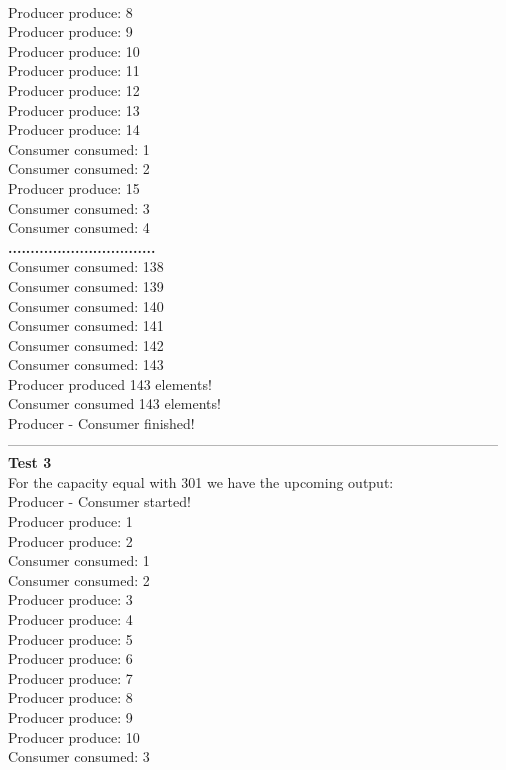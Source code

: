 \documentclass[14pt]{article}
\begin{document}
\\Producer produce: 8
\\Producer produce: 9
\\Producer produce: 10
\\Producer produce: 11
\\Producer produce: 12
\\Producer produce: 13
\\Producer produce: 14
\\Consumer consumed: 1
\\Consumer consumed: 2
\\Producer produce: 15
\\Consumer consumed: 3
\\Consumer consumed: 4
\\\textbf{.................................}
\\Consumer consumed: 138
\\Consumer consumed: 139
\\Consumer consumed: 140
\\Consumer consumed: 141
\\Consumer consumed: 142
\\Consumer consumed: 143
\\Producer produced 143 elements!
\\Consumer consumed 143 elements!
\\Producer - Consumer finished!
\\---------------------------------------------------------------------------------------------------------
\\\textbf{Test 3}
\\For the capacity equal with 301 we have the upcoming output:
\\Producer - Consumer started!
\\Producer produce: 1
\\Producer produce: 2
\\Consumer consumed: 1
\\Consumer consumed: 2
\\Producer produce: 3
\\Producer produce: 4
\\Producer produce: 5
\\Producer produce: 6
\\Producer produce: 7
\\Producer produce: 8
\\Producer produce: 9
\\Producer produce: 10
\\Consumer consumed: 3
\end{document}
